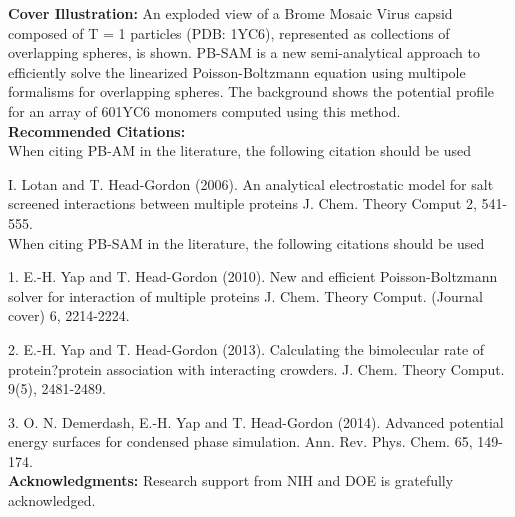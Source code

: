 
\textbf{Cover Illustration:} An exploded view of a Brome Mosaic Virus capsid 
composed of T = 1 particles (PDB: 1YC6), 
represented as collections of overlapping spheres, is shown. 
PB-SAM is a new semi-analytical approach to efficiently solve the 
linearized Poisson-Boltzmann equation using multipole formalisms for overlapping spheres. 
The background shows the potential profile for an array of 601YC6 monomers computed using this method. \\



\textbf{Recommended Citations:} \\

When citing PB-AM in the literature, the following citation should be used

I. Lotan and T. Head-Gordon (2006). An analytical electrostatic model for salt screened interactions between multiple proteins  J. Chem. Theory Comput 2, 541-555. \\ 


When citing PB-SAM in the literature, the following citations should be used

1.  E.-H. Yap and T. Head-Gordon (2010). New and efficient Poisson-Boltzmann solver for interaction of multiple proteins  J. Chem. Theory Comput. (Journal cover) 6, 2214-2224.

2.  E.-H. Yap and T. Head-Gordon (2013). Calculating the bimolecular rate of protein?protein association with interacting crowders.  J. Chem. Theory Comput. 9(5), 2481-2489.

3.   O. N. Demerdash, E.-H. Yap and T. Head-Gordon (2014). Advanced potential energy surfaces for condensed phase simulation.  Ann. Rev. Phys. Chem. 65, 149-174.   \\



\textbf{Acknowledgments:} Research support from NIH and DOE is gratefully acknowledged. \\
